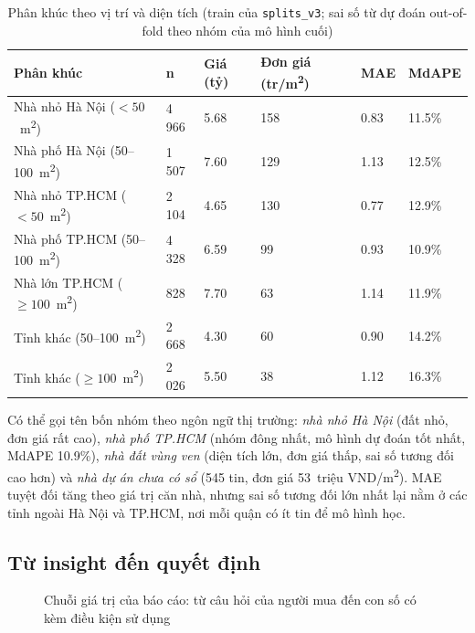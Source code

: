 \documentclass[11pt]{article}
\newcommand{\trm}{triệu VND/m\textsuperscript{2}}
\newcommand{\mtwo}{m\textsuperscript{2}}
\begin{document}
\begin{table}[H]
\centering
\small
\caption{Phân khúc theo vị trí và diện tích (train của \texttt{splits\_v3}; sai số từ dự đoán out-of-fold theo nhóm của mô hình cuối)}
\begin{tabular}{@{}L{0.30\textwidth}L{0.08\textwidth}L{0.12\textwidth}L{0.14\textwidth}L{0.10\textwidth}L{0.12\textwidth}@{}}
\toprule
\textbf{Phân khúc} & \textbf{n} & \textbf{Giá (tỷ)} & \textbf{Đơn giá (tr/m\textsuperscript{2})} & \textbf{MAE} & \textbf{MdAPE} \\
\midrule
Nhà nhỏ Hà Nội ($< 50$~\mtwo) & 4\,966 & 5.68 & 158 & 0.83 & 11.5\% \\
Nhà phố Hà Nội (50--100~\mtwo) & 1\,507 & 7.60 & 129 & 1.13 & 12.5\% \\
Nhà nhỏ TP.HCM ($< 50$~\mtwo) & 2\,104 & 4.65 & 130 & 0.77 & 12.9\% \\
Nhà phố TP.HCM (50--100~\mtwo) & 4\,328 & 6.59 & 99 & 0.93 & 10.9\% \\
Nhà lớn TP.HCM ($\geq 100$~\mtwo) & 828 & 7.70 & 63 & 1.14 & 11.9\% \\
Tỉnh khác (50--100~\mtwo) & 2\,668 & 4.30 & 60 & 0.90 & 14.2\% \\
Tỉnh khác ($\geq 100$~\mtwo) & 2\,026 & 5.50 & 38 & 1.12 & 16.3\% \\
\bottomrule
\end{tabular}
\end{table}

Có thể gọi tên bốn nhóm theo ngôn ngữ thị trường: \textit{nhà nhỏ Hà Nội} (đất nhỏ, đơn giá rất
cao), \textit{nhà phố TP.HCM} (nhóm đông nhất, mô hình dự đoán tốt nhất, MdAPE 10.9\%), \textit{nhà đất
vùng ven} (diện tích lớn, đơn giá thấp, sai số tương đối cao hơn) và \textit{nhà dự án chưa có sổ}
(545 tin, đơn giá 53~\trm). MAE tuyệt đối tăng theo giá trị căn nhà, nhưng sai số tương đối lớn nhất lại
nằm ở các tỉnh ngoài Hà Nội và TP.HCM, nơi mỗi quận có ít tin để mô hình học.

\subsection{Từ insight đến quyết định}

\begin{figure}[H]
\centering
{}
\caption{Chuỗi giá trị của báo cáo: từ câu hỏi của người mua đến con số có kèm điều kiện sử dụng}
\end{figure}
\end{document}
